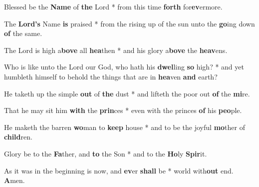 \begin{multicols}{2}
	Blessed be the \textbf{Name} of \textbf{the} Lord * from this time \textbf{forth} for\textbf{ev}ermore.
	
	The \textbf{Lord's} Name \textbf{is} praised * from the rising up of the sun unto the \textbf{go}ing down \textbf{of} the same.
	
	The Lord is high a\textbf{bove} all \textbf{ hea}then * and his glory a\textbf{bove} the \textbf{heav}ens.
	
	Who is like unto the Lord our God, who hath his \textbf{dwel}ling \textbf{so} high? * and yet humbleth himself to behold the things that are in \textbf{hea}ven \textbf{and} earth?
	
	He taketh up the simple \textbf{out} of \textbf{the} dust * and lifteth the poor out \textbf{of} the \textbf{mi}re.
	
	That he may sit him \textbf{with} the \textbf{prin}ces * even with the princes \textbf{of} his \textbf{peo}ple.
	
	He maketh the barren \textbf{wo}man to \textbf{keep} house * and to be the joyful \textbf{mo}ther of \textbf{child}ren.
	
	Glory be to the \textbf{Fa}ther, and \textbf{to} the Son * and to the \textbf{Ho}ly \textbf{Spir}it.
	
	As it was in the beginning is now, and \textbf{ev}er \textbf{shall} be * world with\textbf{out} end. \textbf{A}men.
\end{multicols}